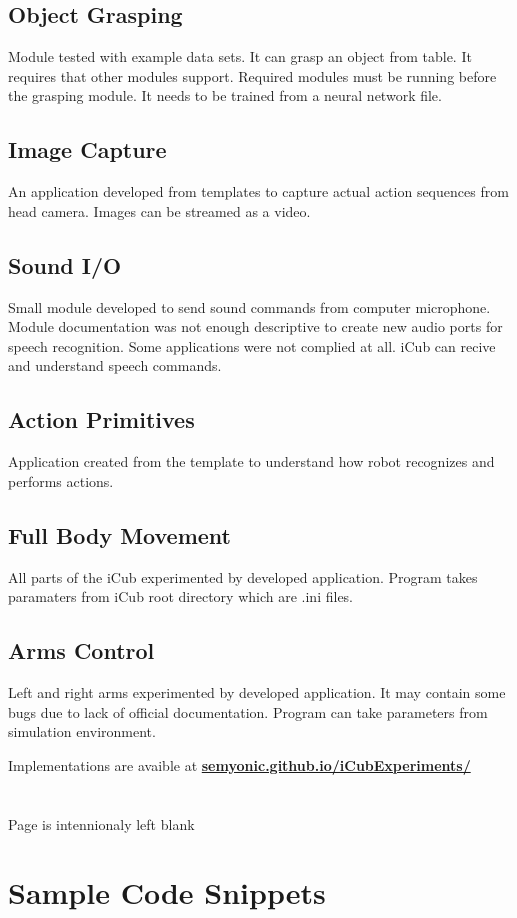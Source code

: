 \documentclass[a4paper, 12pt]{report}
\begin{document}
\section{Object Grasping}
Module tested with example data sets. It can grasp an object from table. It 
requires that other modules support. Required modules must be running before 
the grasping module. It needs to be trained from a neural network file.
\section{Image Capture}
An application developed from templates to capture actual action sequences from 
head camera. Images can be streamed as a video.
\section{Sound I/O}
Small module developed to send sound commands from computer microphone. Module 
documentation was not enough descriptive to create new audio ports for speech 
recognition. Some applications were not complied at all. iCub can recive and 
understand speech commands.
\section{Action Primitives}
Application created from the template to understand how robot recognizes and 
performs actions.
\section{Full Body Movement}
All parts of the iCub experimented by developed application. Program takes 
paramaters from iCub root directory which are .ini files.
\section{Arms Control}
Left and right arms experimented by developed application. It may contain some 
bugs due to lack of official documentation. Program can take parameters from 
simulation environment.
\par 
Implementations are avaible at 
\textbf{\url{semyonic.github.io/iCubExperiments/}}
\chapter*{}
\centering Page is intennionaly left blank
\appendix
\chapter{Sample Code Snippets}
\end{document}
